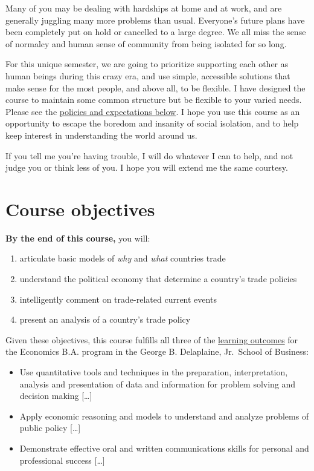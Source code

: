 \documentclass{article}
\providecommand{\tightlist}{%
  \setlength{\itemsep}{0pt}\setlength{\parskip}{0pt}}
\begin{document}
Many of you may be dealing with hardships at home and at work, and are
generally juggling many more problems than usual. Everyone's future
plans have been completely put on hold or cancelled to a large degree.
We all miss the sense of normalcy and human sense of community from
being isolated for so long.

For this unique semester, we are going to prioritize supporting each
other as human beings during this crazy era, and use simple, accessible
solutions that make sense for the most people, and above all, to be
flexible. I have designed the course to maintain some common structure
but be flexible to your varied needs. Please see the
\protect\hyperlink{policies-and-expectations}{policies and expectations
below}. I hope you use this course as an opportunity to escape the
boredom and insanity of social isolation, and to help keep interest in
understanding the world around us.

If you tell me you're having trouble, I will do whatever I can to help,
and not judge you or think less of you. I hope you will extend me the
same courtesy.

\hypertarget{course-objectives}{%
\section*{Course objectives}\label{course-objectives}}

\textbf{By the end of this course,} you will:

\begin{enumerate}
\def\labelenumi{\arabic{enumi}.}
\tightlist
\item
  articulate basic models of \emph{why} and \emph{what} countries trade
\item
  understand the political economy that determine a country's trade
  policies
\item
  intelligently comment on trade-related current events
\item
  present an analysis of a country's trade policy
\end{enumerate}

Given these objectives, this course fulfills all three of the
\href{https://www.hood.edu/academics/departments/george-b-delaplaine-jr-school-business/student-learning-outcomes}{learning
outcomes} for the Economics B.A. program in the George B. Delaplaine,
Jr.~School of Business:

\begin{itemize}
\tightlist
\item
  Use quantitative tools and techniques in the preparation,
  interpretation, analysis and presentation of data and information for
  problem solving and decision making {[}\ldots{]}
\item
  Apply economic reasoning and models to understand and analyze problems
  of public policy {[}\ldots{]}
\item
  Demonstrate effective oral and written communications skills for
  personal and professional success {[}\ldots{]}
\end{itemize}
\end{document}
